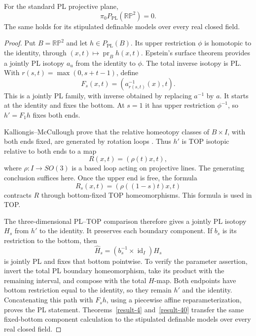 \begin{theorem}\label{thm:projective-plane-components}
For the standard PL projective plane,
\[
                  \pi_0P_{\mathrm{PL}}(\mathbb{RP}^2)=0.
\]
The same holds for its stipulated definable models over every real
closed field.
\end{theorem}

\begin{proof}
Put $B=\mathbb{RP}^2$ and let $h\in P_{\mathrm{PL}}(B)$.
Its upper restriction $\phi$ is homotopic to the identity, through
$(x,t)\mapsto\operatorname{pr}_B h(x,t)$.
Epstein's surface theorem
\cite[Theorem~6.4(a), p.~101]{Epstein1966}
provides a jointly PL isotopy $a_u$ from the identity to $\phi$.
The total inverse isotopy is PL.  With
$r(s,t)=\max(0,s+t-1)$, define
\[
                     F_s(x,t)=(a_{r(s,t)}^{-1}(x),t).
\]
This is a jointly PL family, with inverse obtained by replacing
$a^{-1}$ by $a$.  It starts at the identity and fixes the bottom.
At $s=1$ it has upper restriction $\phi^{-1}$, so
$h'=F_1h$ fixes both ends.

Kalliongis--McCullough prove that the relative homeotopy classes of
$B\times I$, with both ends fixed, are generated by rotation loops
\cite[Section~4.1 and Lemma~4.1.1, p.~110]{KalliongisMcCullough1992}.
Thus $h'$ is TOP isotopic relative to both ends to a map
\[
                  R(x,t)=(\rho(t)x,t),
\]
where $\rho:I\to SO(3)$ is a based loop acting on projective lines.
The generating conclusion suffices here.  Once the upper end is
free, the formula
\[
                  R_s(x,t)=(\rho((1-s)t)x,t)
\]
contracts $R$ through bottom-fixed TOP homeomorphisms.
This formula is used in TOP.

The three-dimensional PL--TOP comparison
\cite[Chapter~I, Section~1, pp.~7--9]{Laudenbach1974}
therefore gives a jointly PL isotopy $H_s$ from $h'$ to the identity.
It preserves each boundary component.  If $b_s$ is its restriction
to the bottom, then
\[
                  \widehat H_s=(b_s^{-1}\times\operatorname{id}_I)H_s
\]
is jointly PL and fixes that bottom pointwise.  To verify the
parameter assertion, invert the total PL boundary homeomorphism,
take its product with the remaining interval, and compose with
the total $H$-map.  Both endpoints have bottom restriction equal
to the identity, so they remain $h'$ and the identity.
Concatenating this path with $F_sh$, using a piecewise affine
reparameterization, proves the PL statement.
Theorems~\ref{result-4} and~\ref{result-40} transfer the same
fixed-bottom component calculation to the stipulated definable
models over every real closed field.
\end{proof}


